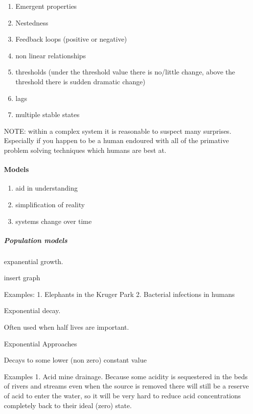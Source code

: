 \documentclass[]{article}
\providecommand{\tightlist}{%
  \setlength{\itemsep}{0pt}\setlength{\parskip}{0pt}}
\let\oldparagraph\paragraph
\renewcommand{\paragraph}[1]{\oldparagraph{#1}\mbox{}}
\let\oldsubparagraph\subparagraph
\renewcommand{\subparagraph}[1]{\oldsubparagraph{#1}\mbox{}}
\begin{document}
\begin{enumerate}
\def\labelenumi{\arabic{enumi}.}
\tightlist
\item
  Emergent properties
\item
  Nestedness
\item
  Feedback loops (positive or negative)
\item
  non linear relationships
\item
  thresholds (under the threshold value there is no/little change, above
  the threshold there is sudden dramatic change)
\item
  lags
\item
  multiple stable states
\end{enumerate}

NOTE: within a complex system it is reasonable to suspect many
surprises. Especially if you happen to be a human endoured with all of
the primative problem solving techniques which humans are best at.

\hypertarget{models}{%
\paragraph{Models}\label{models}}

\begin{enumerate}
\def\labelenumi{\arabic{enumi}.}
\tightlist
\item
  aid in understanding
\item
  simplification of reality
\item
  systems change over time
\end{enumerate}

\hypertarget{population-models}{%
\subparagraph{Population models}\label{population-models}}

expanential growth.

insert graph

Examples: 1. Elephants in the Kruger Park 2. Bacterial infections in
humans

Exponential decay.

Often used when half lives are important.

Exponential Approaches

Decays to some lower (non zero) constant value

Examples 1. Acid mine drainage. Because some acidity is sequestered in
the beds of rivers and streams even when the source is removed there
will still be a reserve of acid to enter the water, so it will be very
hard to reduce acid concentrations completely back to their ideal (zero)
state.
\end{document}
